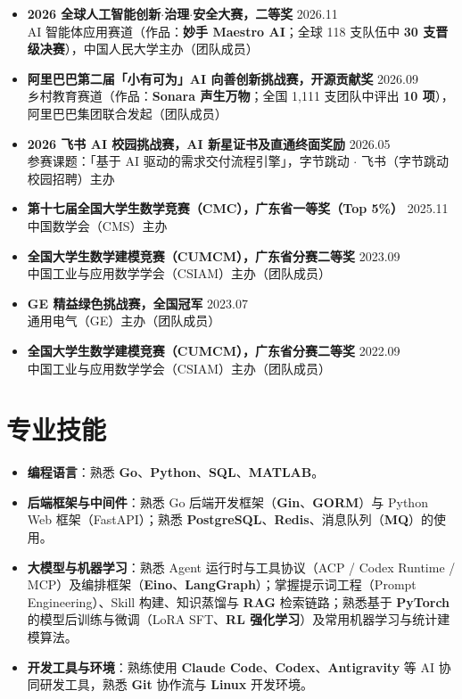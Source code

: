\documentclass[10pt,letterpaper]{article}
\begin{document}
\begin{itemize}
  \item \textbf{2026 全球人工智能创新$\cdot$治理$\cdot$安全大赛，二等奖} \hfill 2026.11 \\
  AI 智能体应用赛道（作品：\textbf{妙手 Maestro AI}；全球 118 支队伍中 \textbf{30 支晋级决赛}），中国人民大学主办（团队成员）

  \item \textbf{阿里巴巴第二届「小有可为」AI 向善创新挑战赛，开源贡献奖} \hfill 2026.09 \\
  乡村教育赛道（作品：\textbf{Sonara 声生万物}；全国 1,111 支团队中评出 \textbf{10 项}），阿里巴巴集团联合发起（团队成员）

  \item \textbf{2026 飞书 AI 校园挑战赛，AI 新星证书及直通终面奖励} \hfill 2026.05 \\
  参赛课题：「基于 AI 驱动的需求交付流程引擎」，字节跳动 $\cdot$ 飞书（字节跳动校园招聘）主办

  \item \textbf{第十七届全国大学生数学竞赛（CMC），广东省一等奖（Top 5\%）} \hfill 2025.11 \\
  中国数学会（CMS）主办

  \item \textbf{全国大学生数学建模竞赛（CUMCM），广东省分赛二等奖} \hfill 2023.09 \\
  中国工业与应用数学学会（CSIAM）主办（团队成员）

  \item \textbf{GE 精益绿色挑战赛，全国冠军} \hfill 2023.07 \\
  通用电气（GE）主办（团队成员）

  \item \textbf{全国大学生数学建模竞赛（CUMCM），广东省分赛二等奖} \hfill 2022.09 \\
  中国工业与应用数学学会（CSIAM）主办（团队成员）
\end{itemize}

\section{专业技能}

\begin{itemize}
  \item \textbf{编程语言}：熟悉 \textbf{Go}、\textbf{Python}、\textbf{SQL}、\textbf{MATLAB}。
  \item \textbf{后端框架与中间件}：熟悉 Go 后端开发框架（\textbf{Gin}、\textbf{GORM}）与 Python Web 框架（FastAPI）；熟悉 \textbf{PostgreSQL}、\textbf{Redis}、消息队列（\textbf{MQ}）的使用。
  \item \textbf{大模型与机器学习}：熟悉 Agent 运行时与工具协议（ACP / Codex Runtime / MCP）及编排框架（\textbf{Eino}、\textbf{LangGraph}）；掌握提示词工程（Prompt Engineering）、Skill 构建、知识蒸馏与 \textbf{RAG} 检索链路；熟悉基于 \textbf{PyTorch} 的模型后训练与微调（LoRA SFT、\textbf{RL 强化学习}）及常用机器学习与统计建模算法。
  \item \textbf{开发工具与环境}：熟练使用 \textbf{Claude Code}、\textbf{Codex}、\textbf{Antigravity} 等 AI 协同研发工具，熟悉 \textbf{Git} 协作流与 \textbf{Linux} 开发环境。
\end{itemize}
\end{document}
